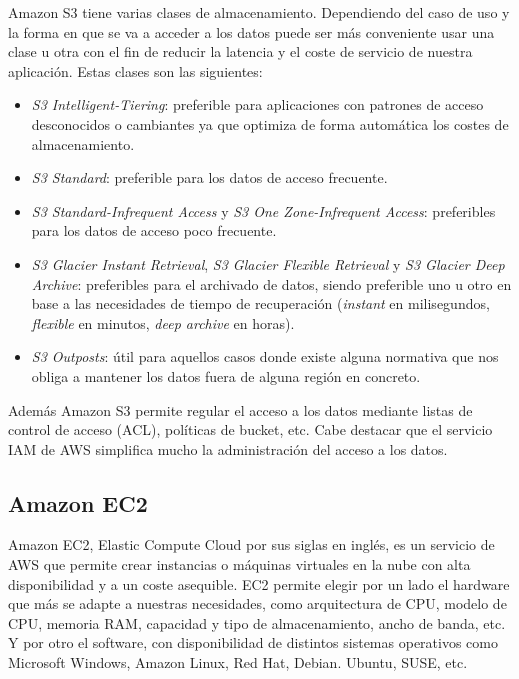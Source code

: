 Amazon S3 tiene varias clases de almacenamiento. Dependiendo del caso de uso y la forma en que se va a acceder a los datos puede ser más conveniente usar una clase u otra con el fin de reducir la latencia y el coste de servicio de nuestra aplicación. Estas clases son las siguientes:
\begin{itemize}
    \item \textit{S3 Intelligent-Tiering}: preferible para aplicaciones con patrones de acceso desconocidos o cambiantes ya que optimiza de forma automática los costes de almacenamiento.
    \item \textit{S3 Standard}: preferible para los datos de acceso frecuente.
    \item \textit{S3 Standard-Infrequent Access} y \textit{S3 One Zone-Infrequent Access}: preferibles para los datos de acceso poco frecuente.
    \item \textit{S3 Glacier Instant Retrieval}, \textit{S3 Glacier Flexible Retrieval} y \textit{S3 Glacier Deep Archive}: preferibles para el archivado de datos, siendo preferible uno u otro en base a las necesidades de tiempo de recuperación (\textit{instant} en milisegundos, \textit{flexible} en minutos, \textit{deep archive} en horas).
    \item \textit{S3 Outposts}: útil para aquellos casos donde existe alguna normativa que nos obliga a mantener los datos fuera de alguna región en concreto.
\end{itemize}

Además Amazon S3 permite regular el acceso a los datos mediante listas de control de acceso (ACL), políticas de bucket, etc. Cabe destacar que el servicio IAM de AWS simplifica mucho la administración del acceso a los datos.

\subsection{Amazon EC2}

Amazon EC2, Elastic Compute Cloud por sus siglas en inglés, es un servicio de AWS que permite crear instancias o máquinas virtuales en la nube con alta disponibilidad y a un coste asequible. EC2 permite elegir por un lado el hardware que más se adapte a nuestras necesidades, como arquitectura de CPU, modelo de CPU, memoria RAM, capacidad y tipo de almacenamiento, ancho de banda, etc. Y por otro el software, con disponibilidad de distintos sistemas operativos como Microsoft Windows, Amazon Linux, Red Hat, Debian. Ubuntu, SUSE, etc.


